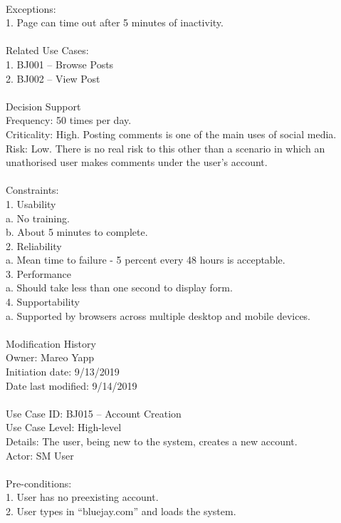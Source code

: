 \documentclass{report}
\begin{document}
\\
Exceptions: \\
1.	Page can time out after 5 minutes of inactivity.\\
\\
Related Use Cases: \\
1.	BJ001 – Browse Posts\\
2.	BJ002 – View Post\\
\\
Decision Support\\
     Frequency: 50 times per day.\\
     Criticality: High. Posting comments is one of the main uses of social media. \\
     Risk: Low. There is no real risk to this other than a scenario in which an unathorised user makes comments under the user’s account.\\
\\
Constraints:\\
1.	Usability\\
	a.	No training.\\
	b.	About 5 minutes to complete.\\
2.	Reliability\\
	a.	Mean time to failure - 5 percent every 48 hours is acceptable.\\
3.	Performance\\
	a.	Should take less than one second to display form.\\
4.	Supportability\\
a.	Supported by browsers across multiple desktop and mobile devices.\\
\\
Modification History\\
     Owner: Mareo Yapp\\
     Initiation date: 9/13/2019\\
     Date last modified: 9/14/2019\\
\\
Use Case ID: BJ015 – Account Creation\\
Use Case Level: High-level\\
Details: The user, being new to the system, creates a new account.\\
Actor: SM User\\
\\
Pre-conditions: \\
1.	User has no preexisting account.\\
2.	User types in “bluejay.com” and loads the system.\\
\end{document}

